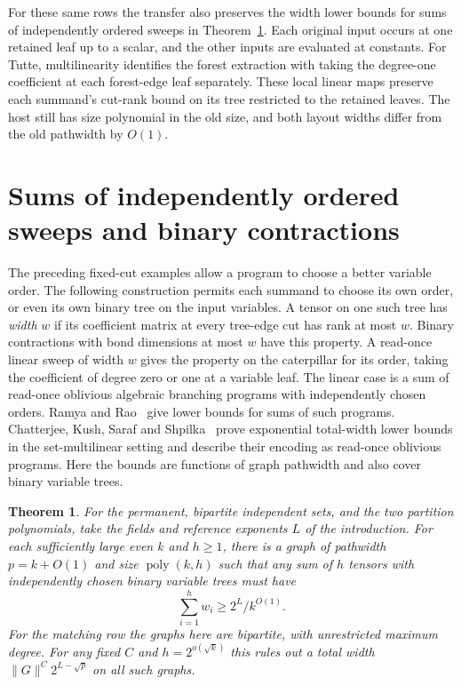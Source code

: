 \documentclass[11pt]{article}
\newtheorem{theorem}{Theorem}[section]
\theoremstyle{definition}
\begin{document}
For these same rows the transfer also preserves the width lower bounds for sums of independently ordered sweeps in Theorem~\ref{thm:orders}. Each original input occurs at one retained leaf up to a scalar, and the other inputs are evaluated at constants. For Tutte, multilinearity identifies the forest extraction with taking the degree-one coefficient at each forest-edge leaf separately. These local linear maps preserve each summand's cut-rank bound on its tree restricted to the retained leaves. The host still has size polynomial in the old size, and both layout widths differ from the old pathwidth by \(O(1)\).

\section{Sums of independently ordered sweeps and binary contractions}\label{sec:orders}

The preceding fixed-cut examples allow a program to choose a better variable order. The following construction permits each summand to choose its own order, or even its own binary tree on the input variables. A tensor on one such tree has \emph{width} \(w\) if its coefficient matrix at every tree-edge cut has rank at most \(w\). Binary contractions with bond dimensions at most \(w\) have this property. A read-once linear sweep of width \(w\) gives the property on the caterpillar for its order, taking the coefficient of degree zero or one at a variable leaf. The linear case is a sum of read-once oblivious algebraic branching programs with independently chosen orders. Ramya and Rao~\cite[Theorem~1]{ramya-rao-roabps} give lower bounds for sums of such programs. Chatterjee, Kush, Saraf and Shpilka~\cite[Theorems~1.6 and~1.6$'$ and Section~1.4]{ckss-roabps} prove exponential total-width lower bounds in the set-multilinear setting and describe their encoding as read-once oblivious programs. Here the bounds are functions of graph pathwidth and also cover binary variable trees.

\begin{theorem}\label{thm:orders}
For the permanent, bipartite independent sets, and the two partition polynomials, take the fields and reference exponents \(L\) of the introduction. For each sufficiently large even \(k\) and \(h\ge1\), there is a graph of pathwidth \(p=k+O(1)\) and size \(\operatorname{poly}(k,h)\) such that any sum of \(h\) tensors with independently chosen binary variable trees must have
\[
                       \sum_{i=1}^h w_i\ge 2^L/k^{O(1)} .
\]
For the matching row the graphs here are bipartite, with unrestricted maximum degree. For any fixed \(C\) and \(h=2^{o(\sqrt k)}\) this rules out a total width \(\|G\|^C 2^{L-\sqrt p}\) on all such graphs.
\end{theorem}
\end{document}
